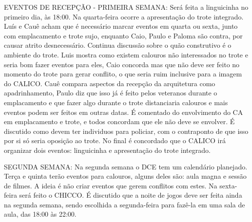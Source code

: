\documentclass{ata-calico}
\begin{document}
EVENTOS DE RECEPÇÃO - PRIMEIRA SEMANA:
Será feita a linguicinha no primeiro dia, às 18:00. Na quarta-feira ocorre a apresentação do trote integrado. Luís e Cauê acham que é necessário marcar eventos em quarta ou sexta, junto com emplacamento e trote sujo, enquanto Caio, Paulo e Paloma são contra, por causar atrito desnecessário. Continua discussão sobre o quão construtivo é o ambiente do trote. Luis mostra como existem calouros não interessados no trote e seria bom fazer eventos para eles, Caio concorda mas que não deve ser feito no momento do trote para gerar conflito, o que seria ruim inclusive para a imagem do CALICO. Cauê compara aspectos da recepção da arquitetura como apadrinhamento, Paulo diz que isso já é feito pelos veteranos durante o emplacamento e que fazer algo durante o trote distanciaria calouros e mais eventos podem ser feitos em outras datas. É comentado do envolvimento do CA em emplacamento e trote, e todos concordam que ele não deve se envolver. É discutido como devem ter individuos para policiar, com o contraponto de que isso por si só seria oposição ao trote. No final é concordado que o CALICO irá organizar dois eventos: linguicinha e apresentação do trote integrado.\newline

SEGUNDA SEMANA: Na segunda semana o DCE tem um calendário planejado. Terça e quinta terão eventos para calouros, alguns deles são: aula magna e sessão de filmes. A ideia é não criar eventos que gerem conflitos com estes. Na sexta-feira será feito o CHICCO. É discutido que a noite de jogos deve ser feita ainda na segunda semana, sendo escolhida a segunda-feira para fazê-la em uma sala de aula, das 18:00 às 22:00.\newline
\end{document}
